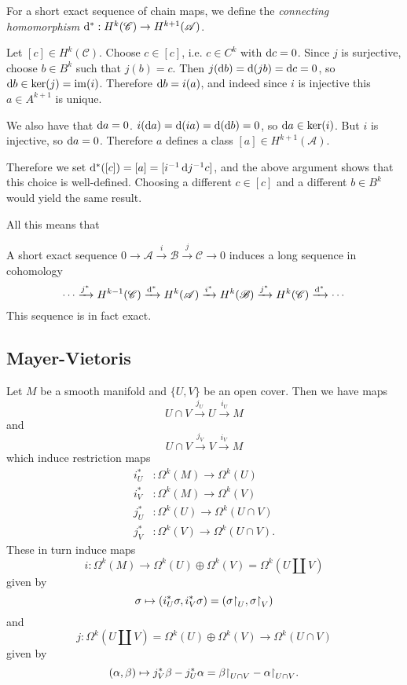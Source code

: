 For a short exact sequence of chain maps,
we define the \emph{connecting homomorphism}
$\mathop{}\!\mathrm{d}^\ast : H^k(\mathscr{C}) \to H^{k+1}(\mathscr{A})$.

Let $[c] \in H^k(\mathscr{C})$. Choose
$c \in [c]$, i.e. $c \in C^k$ with $\mathop{}\!\mathrm{d} c = 0$. Since
$j$ is surjective, choose $b \in B^k$ such that
$j(b) = c$. Then
$j(\mathop{}\!\mathrm{d} b) = \mathop{}\!\mathrm{d}(j b) = \mathop{}\!\mathrm{d} c = 0$, so
$\mathop{}\!\mathrm{d} b \in \ker(j) = \mathrm{im}(i)$. Therefore
$\mathop{}\!\mathrm{d} b = i(a)$, and indeed since $i$ is injective
this $a \in A^{k+1}$ is unique.

We also have that $\mathop{}\!\mathrm{d} a = 0$.
$i(\mathop{}\!\mathrm{d} a) = \mathop{}\!\mathrm{d}(i a) = \mathop{}\!\mathrm{d}(\mathop{}\!\mathrm{d} b) = 0$, so
$\mathop{}\!\mathrm{d} a \in \ker(i)$. But $i$ is injective, so
$\mathop{}\!\mathrm{d} a = 0$. Therefore $a$ defines a class
$[a] \in H^{k+1}(\mathscr{A})$.

Therefore we set
$\mathop{}\!\mathrm{d}^\ast([c]) = [a] = [i^{-1} \mathop{}\!\mathrm{d} j^{-1} c]$,
and the above argument shows that this choice is well-defined.
Choosing a different $c \in [c]$ and a different $b \in B^k$ would
yield the same result.

All this means that
\begin{lemma}
A short exact sequence
$
0           \xrightarrow{}
\mathscr{A} \xrightarrow{i}
\mathscr{B} \xrightarrow{j}
\mathscr{C} \xrightarrow{}
0
$
induces a long sequence in cohomology
$$
\cdots              \xrightarrow{j^\ast}
H^{k-1}(\mathscr{C}) \xrightarrow{\mathop{}\!\mathrm{d}^\ast}
H^{k}(\mathscr{A})   \xrightarrow{i^\ast}
H^{k}(\mathscr{B})   \xrightarrow{j^\ast}
H^{k}(\mathscr{C})   \xrightarrow{\mathop{}\!\mathrm{d}^\ast}
\cdots
$$
This sequence is in fact exact.
\end{lemma}

\subsection{Mayer-Vietoris}
Let $M$ be a smooth manifold and $\{U, V\}$ be an open cover.
Then we have maps
$$
U \cap V \xrightarrow{j_U}
U        \xrightarrow{i_U}
M
$$
and
$$
U \cap V \xrightarrow{j_V}
V        \xrightarrow{i_V}
M
$$
which induce restriction maps
\begin{align*}
  i_U^\ast &: \Omega^k(M) \to \Omega^k(U) \\
  i_V^\ast &: \Omega^k(M) \to \Omega^k(V) \\
  j_U^\ast &: \Omega^k(U) \to \Omega^k(U \cap V) \\
  j_V^\ast &: \Omega^k(V) \to \Omega^k(U \cap V).
\end{align*}
These in turn induce maps
$$
  i
:   \Omega^k(M)
\to \Omega^k(U) \oplus \Omega^k(V)
=   \Omega^k(U \coprod V)
$$
given by
$$
        \sigma
\mapsto (i_U^\ast \sigma, i_V^\ast \sigma)
=       (\sigma\mathord{\upharpoonright}_U, \sigma\mathord{\upharpoonright}_V)
$$
and
$$
  j
:   \Omega^k(U \coprod V)
=   \Omega^k(U) \oplus \Omega^k(V)
\to \Omega^k(U \cap V)
$$
given by
$$
        (\alpha, \beta)
\mapsto j_V^\ast \beta - j_U^\ast \alpha
=       \beta\mathord{\upharpoonright}_{U \cap V} - \alpha\mathord{\upharpoonright}_{U \cap V}.
$$

